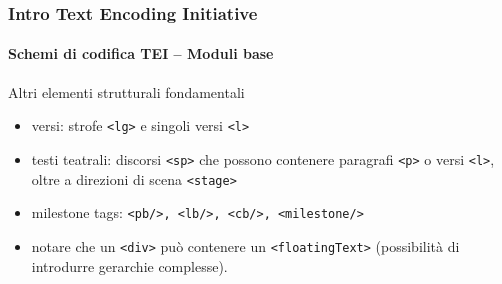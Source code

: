 \begin{frame}
	\frametitle{Intro Text Encoding Initiative}
	\framesubtitle{Schemi di codifica TEI – Moduli base}
	\addtocounter{nframe}{1}

	\begin{block}{Altri elementi strutturali fondamentali}
        \begin{itemize}
            \item versi: strofe \texttt{<lg>} e singoli versi \texttt{<l>}
            \item testi teatrali: discorsi \texttt{<sp>} che possono contenere paragrafi
            \texttt{<p>} o versi \texttt{<l>}, oltre a direzioni di scena \texttt{<stage>}
            \item milestone tags: \texttt{<pb/>, <lb/>, <cb/>, <milestone/>}
            \item notare che un \texttt{<div>} può contenere un \texttt{<floatingText>} (possibilità di introdurre gerarchie complesse).
        \end{itemize}
        
    \end{block}

\end{frame}




